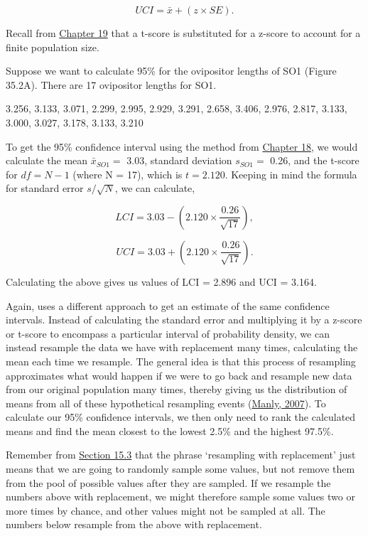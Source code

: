 \documentclass[
  openany]{krantz}
\begin{document}
\[UCI = \bar{x} + (z \times SE).\]

Recall from \protect\hyperlink{Chapter_19}{Chapter 19} that a t-score is substituted for a z-score to account for a finite population size.

Suppose we want to calculate 95\%  for the ovipositor lengths of SO1 (Figure 35.2A).
There are 17 ovipositor lengths for SO1.

3.256, 3.133, 3.071, 2.299, 2.995, 2.929, 3.291, 2.658, 3.406, 2.976, 2.817, 3.133, 3.000, 3.027, 3.178, 3.133, 3.210

To get the 95\% confidence interval using the method from \protect\hyperlink{Chapter_18}{Chapter 18}, we would calculate the mean \(\bar{x}_{SO1} =\) 3.03, standard deviation \(s_{SO1} =\) 0.26, and the t-score for \(df = N - 1\) (where N = 17), which is \(t = 2.120\).
Keeping in mind the formula for standard error \(s/\sqrt{N}\), we can calculate,

\[LCI = 3.03 - \left(2.120 \times \frac{0.26}{\sqrt{17}}\right),\]

\[UCI = 3.03 + \left(2.120 \times \frac{0.26}{\sqrt{17}}\right).\]

Calculating the above gives us values of LCI = 2.896 and UCI = 3.164.

Again,  uses a different approach to get an estimate of the same confidence intervals.
Instead of calculating the standard error and multiplying it by a z-score or t-score to encompass a particular interval of probability density, we can instead resample the data we have with replacement many times, calculating the mean each time we resample.
The general idea is that this process of resampling approximates what would happen if we were to go back and resample new data from our original population many times, thereby giving us the distribution of means from all of these hypothetical resampling events (\protect\hyperlink{ref-Manly2007}{Manly, 2007}).
To calculate our 95\% confidence intervals, we then only need to rank the calculated means and find the mean closest to the lowest 2.5\% and the highest 97.5\%.

Remember from \protect\hyperlink{sampling-with-and-without-replacement}{Section 15.3} that the phrase `resampling with replacement' just means that we are going to randomly sample some values, but not remove them from the pool of possible values after they are sampled.
If we resample the numbers above with replacement, we might therefore sample some values two or more times by chance, and other values might not be sampled at all.
The numbers below resample from the above with replacement.
\end{document}
